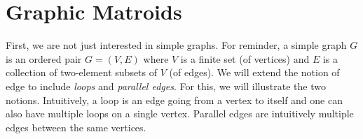 \section{Graphic Matroids}


First, we are not just interested in simple graphs. For reminder, a simple graph $G$ is an ordered pair $G = (V, E)$ where $V$ is a finite set (of vertices) and $E$ is a collection of two-element subsets of $V$ (of edges). We will extend the notion of edge to include \textit{loops} and \textit{parallel edges}. For this, we will illustrate the two notions. Intuitively, a loop is an edge going from a vertex to itself and one can also have multiple loops on a single vertex. Parallel edges are intuitively multiple edges between the same vertices.



